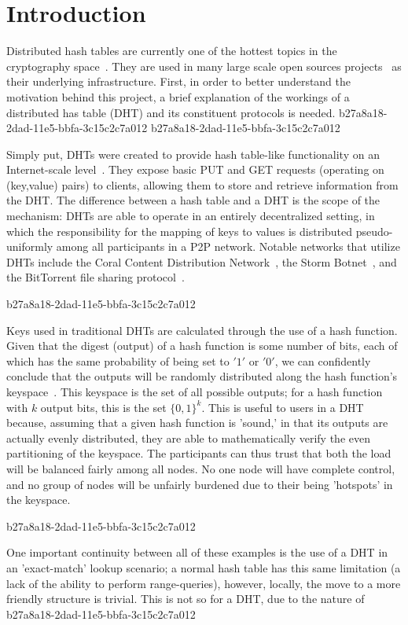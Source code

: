 \documentclass[12pt]{article}
\begin{document}
\section{Introduction}
\par Distributed hash tables are currently one of the hottest topics in the cryptography space~\cite{Stoica:2001dj,Rowstron:2001ea,Ratnasamy:2001wn}. They are used in many large scale open sources projects~\cite{Freitas:2013tb,Xu:2010vs,Perfitt:2010fh} as their underlying infrastructure. First, in order to better understand the motivation behind this project, a brief explanation of the workings of a distributed has table (DHT) and its constituent protocols is needed.
b27a8a18-2dad-11e5-bbfa-3c15c2c7a012
b27a8a18-2dad-11e5-bbfa-3c15c2c7a012\par Simply put, DHTs were created to provide hash table-like functionality on an Internet-scale level~\cite{Ratnasamy:2001wn}. They expose basic PUT and GET requests (operating on (key,value) pairs) to clients, allowing them to store and retrieve information from the DHT. The difference between a hash table and a DHT is the scope of the mechanism: DHTs are able to operate in an entirely decentralized setting, in which the responsibility for the mapping of keys to values is distributed pseudo-uniformly among all participants in a P2P network. Notable networks that utilize DHTs include the Coral Content Distribution Network~\cite{Freedman:2004vb}, the Storm Botnet~\cite{Holz:2008uk}, and the BitTorrent file sharing protocol~\cite{Cohen:y1_8mBnw}.

b27a8a18-2dad-11e5-bbfa-3c15c2c7a012\par Keys used in traditional DHTs are calculated through the use of a hash function. Given that the digest (output) of a hash function is some number of bits, each of which has the same probability of being set to $'1'$ or $'0'$, we can confidently conclude that the outputs will be randomly distributed along the hash function's keyspace~. This keyspace is the set of all possible outputs; for a hash function with $k$ output bits, this is the set $\{0,1\}^k$. This is useful to users in a DHT because, assuming that a given hash function is 'sound,' in that its outputs are actually evenly distributed, they are able to mathematically verify the even partitioning of the keyspace. The participants can thus trust that both the load will be balanced fairly among all nodes. No one node will have complete control, and no group of nodes will be unfairly burdened due to their being 'hotspots' in the keyspace.~

b27a8a18-2dad-11e5-bbfa-3c15c2c7a012\par One important continuity between all of these examples is the use of a DHT in an 'exact-match' lookup scenario; a normal hash table has this same limitation (a lack of the ability to perform range-queries), however, locally, the move to a more friendly structure is trivial. This is not so for a DHT, due to the nature of
\printbibliography
b27a8a18-2dad-11e5-bbfa-3c15c2c7a012
\end{document}

